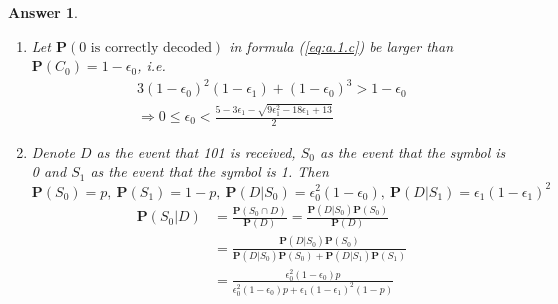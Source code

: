 \documentclass[utf8]{article}
\theoremstyle{definition}%
\theoremstyle{plain}%
\newtheorem{answer}{Answer} %
\begin{document}
\begin{answer}
\begin{enumerate}[label=(\alph*)]
\begin{equation}
    \end{equation}
    Thus, the probability that a 0 is correctly decoded is
    \begin{equation}
    \begin{aligned}
        \label{eq:a.1.c}
        \mathbf{P}(\text{0 is correctly decoded}) &= \mathbf{P}(Z_2) + \mathbf{P}(Z_3) \\
        &= 3(1-\epsilon_0)^2(1-\epsilon_1) + (1-\epsilon_0)^3
    \end{aligned}
    \end{equation}
    P.S. We do not take the situation into consideration that the sender sends 1 and the receiver decodes it as 0.
    \item Let $\mathbf{P}(\text{0 is correctly decoded})$ in formula (\ref{eq:a.1.c}) be larger than $\mathbf{P}(C_0) = 1-\epsilon_0$, i.e.
    \begin{equation}
    \begin{aligned}
        3(1-\epsilon_0)^2(1-\epsilon_1) + (1-\epsilon_0)^3 > 1-\epsilon_0 \\ 
        \Rightarrow 0 \leq \epsilon_0 < \frac{5-3\epsilon_1 -\sqrt{9\epsilon_1^2 - 18\epsilon_1 + 13}}{2}
    \end{aligned}
    \end{equation}
    \item Denote $D$ as the event that 101 is received, $S_0$ as the event that the symbol is 0 and $S_1$ as the event that the symbol is 1. Then 
    \begin{equation}
        \mathbf{P}(S_0) = p,~ \mathbf{P}(S_1) = 1-p,~ \mathbf{P}(D | S_0) = \epsilon_0^2(1-\epsilon_0),~ \mathbf{P}(D | S_1) = \epsilon_1(1-\epsilon_1)^2
    \end{equation}
    \begin{equation}
    \begin{aligned}
        \mathbf{P}(S_0 | D) &= \frac{\mathbf{P}(S_0 \cap D)}{\mathbf{P}(D)} = \frac{\mathbf{P}(D | S_0) \mathbf{P}(S_0)}{\mathbf{P}(D)} \\ 
        &= \frac{\mathbf{P}(D | S_0) \mathbf{P}(S_0)}{\mathbf{P}(D | S_0) \mathbf{P}(S_0) + \mathbf{P}(D | S_1) \mathbf{P}(S_1)} \\ 
        &= \frac{\epsilon_0^2(1-\epsilon_0)p}{\epsilon_0^2(1-\epsilon_0)p + \epsilon_1(1-\epsilon_1)^2(1-p)}
    \end{aligned}
    \end{equation}
\end{enumerate}
\end{answer}
\end{document}
